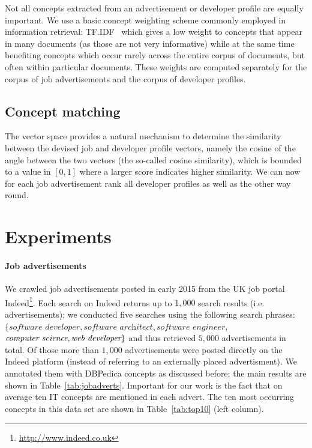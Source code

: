 \documentclass[conference]{IEEEtran}
\begin{document}
Not all concepts extracted from an advertisement or developer profile are
equally important. We use a basic concept weighting scheme commonly employed in information retrieval: TF.IDF~\cite{baeza1999modern} which gives a low weight to concepts that appear in many documents (as those are not very informative) while at the same time benefiting concepts which occur rarely across the entire corpus of documents, but often within particular documents. These weights are computed separately for the corpus of job advertisements and the corpus of developer profiles. 


\subsection{Concept matching}

The vector space provides a natural mechanism to determine the similarity
between the devised job and developer profile vectors, namely the cosine of the
angle between the two vectors (the so-called cosine similarity), which is
bounded to a value in $[0,1]$ where a larger score indicates higher similarity.
We can now for each job advertisement rank all developer profiles as well as the
other way round.

\section{Experiments}

\paragraph{Job advertisements} 
We crawled job advertisements posted in early 2015 from the UK job portal  Indeed\footnote{\url{http://www.indeed.co.uk}}. Each search on Indeed returns up to $1,000$ search results (i.e. advertisements); we conducted five searches using the following search phrases: $\{\textit{software developer}, \textit{software architect}, \textit{software engineer},$ $\emph{computer science}, \emph{web developer}\}$ and thus retrieved $5,000$ advertisements in total. Of those more than $1,000$ advertisements were posted directly on the Indeed platform (instead of referring to an externally placed advertisment). We annotated them with DBPedica concepts as discussed before; the main results are shown in Table~\ref{tab:jobadverts}. Important for our work is the fact that on average ten IT concepts are mentioned in each advert. The ten most occurring concepts in this data set are shown in Table~\ref{tab:top10} (left column). 
\end{document}
